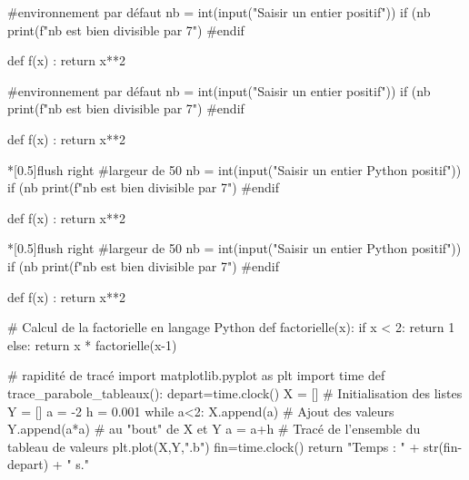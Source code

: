 \documentclass{article}
\begin{document}
\begin{codetex}
\begin{envcodepython}{} %
#environnement par défaut
nb = int(input("Saisir un entier positif"))
if (nb %
	print(f"{nb} est bien divisible par 7")
#endif

def f(x) :
	return x**2
\end{envcodepython}
\end{codetex}

\begin{codesortie}
\begin{envcodepython}{}
#environnement par défaut
nb = int(input("Saisir un entier positif"))
if (nb %
	print(f"{nb} est bien divisible par 7")
#endif

def f(x) :
	return x**2
\end{envcodepython}
\end{codesortie}

\begin{codetex}
\begin{envcodepython}*[0.5\linewidth]{flush right}
#largeur de 50%
nb = int(input("Saisir un entier Python positif"))
if (nb %
	print(f"{nb} est bien divisible par 7")
#endif

def f(x) :
	return x**2
\end{envcodepython}
\end{codetex}

\begin{codesortie}
\begin{envcodepython}*[0.5\linewidth]{flush right}
#largeur de 50%
nb = int(input("Saisir un entier Python positif"))
if (nb %
	print(f"{nb} est bien divisible par 7")
#endif

def f(x) :
	return x**2
\end{envcodepython}
\end{codesortie}

\begin{codetex}
\begin{scontents}[overwrite,write-out=testscript.py]
# Calcul de la factorielle en langage Python
def factorielle(x):
	if x < 2:
		return 1
	else:
		return x * factorielle(x-1)

# rapidité de tracé
import matplotlib.pyplot as plt
import time
def trace_parabole_tableaux():
	depart=time.clock()
	X = [] # Initialisation des listes
	Y = []
	a = -2
	h = 0.001
	while a<2:
		X.append(a) # Ajout des valeurs
		Y.append(a*a) # au "bout" de X et Y
		a = a+h
	# Tracé de l'ensemble du tableau de valeurs
	plt.plot(X,Y,".b")
	fin=time.clock()
	return "Temps : " + str(fin-depart) + " s."
\end{scontents}

\end{codetex}
\end{document}

